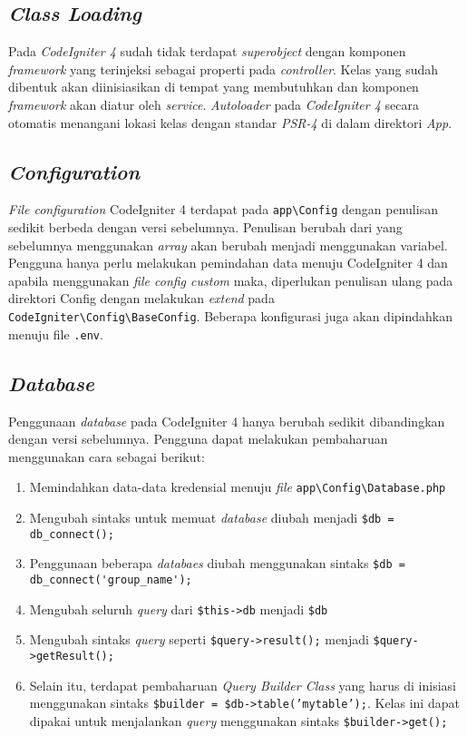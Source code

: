 \subsection{\textit{Class Loading}}
Pada \textit{CodeIgniter 4} sudah tidak terdapat \textit{superobject} dengan komponen \textit{framework} yang terinjeksi sebagai properti pada \textit{controller}. Kelas yang sudah dibentuk akan diinisiasikan di tempat yang membutuhkan dan komponen \textit{framework} akan diatur oleh \textit{service}. \textit{Autoloader} pada \textit{CodeIgniter 4} secara otomatis menangani lokasi kelas dengan standar \textit{PSR-4} di dalam direktori \textit{App}.
 
\subsection{\textit{Configuration}}

\textit{File configuration} CodeIgniter 4 terdapat pada \verb|app\Config| dengan penulisan sedikit berbeda dengan versi sebelumnya. Penulisan berubah dari yang sebelumnya menggunakan \textit{array} akan berubah menjadi menggunakan variabel. Pengguna hanya perlu melakukan pemindahan data menuju CodeIgniter 4 dan apabila menggunakan \textit{file config custom} maka, diperlukan penulisan ulang pada direktori Config dengan melakukan \textit{extend} pada \verb|CodeIgniter\Config\BaseConfig|. Beberapa konfigurasi juga akan dipindahkan menuju file \texttt{.env}.

\subsection{\textit{Database}}

Penggunaan \textit{database} pada CodeIgniter 4 hanya berubah sedikit dibandingkan dengan versi sebelumnya. Pengguna dapat melakukan pembaharuan menggunakan cara sebagai berikut:
\begin{enumerate}
	\item Memindahkan data-data kredensial menuju \textit{file} \verb|app\Config\Database.php|
	\item Mengubah sintaks untuk memuat \textit{database} diubah menjadi \verb|$db = db_connect();|
	\item Penggunaan beberapa \textit{databaes} diubah menggunakan sintaks \verb|$db = db_connect('group_name');|
	\item Mengubah seluruh \textit{query} dari \verb|$this->db| menjadi \verb|$db|
	\item Mengubah sintaks \textit{query} seperti \verb|$query->result();| menjadi \verb|$query->getResult();|
	\item Selain itu, terdapat pembaharuan \textit{Query Builder Class} yang harus di inisiasi menggunakan sintaks \texttt{\$builder = \$db->table('mytable');}. Kelas ini dapat dipakai untuk menjalankan \textit{query} menggunakan sintaks \verb|$builder->get();|
\end{enumerate}

